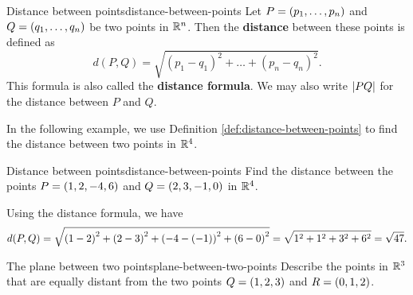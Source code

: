 \begin{definition}{Distance between points}{distance-between-points}
  Let $P=\left(p_{1},\ldots,p_{n}\right)$ and $Q=\left(q_{1},\ldots,q_{n}\right)$ be
  two points in $\mathbb{R}^{n}$. Then the \textbf{distance}
  between these points is defined as
  \begin{equation*}
    d(P, Q) = \sqrt{(p_1-q_1)^2 + \ldots + (p_n-q_n)^2}.
  \end{equation*}
  This formula is also called the \textbf{distance
    formula}. We may also write $\left|PQ\right|$
  for the distance between $P$ and $Q$.
\end{definition}

In the following example, we use Definition
\ref{def:distance-between-points} to find the distance between two
points in $\mathbb{R}^4$.

\begin{example}{Distance between points}{distance-between-points}
  Find the distance between the points $P=\left(1,2,-4,6\right)$ and
  $Q=\left(2,3,-1,0\right)$ in $\mathbb{R}^{4}$.
\end{example}

\begin{solution}
  Using the distance formula, we have
  \begin{equation*}
    d(P,Q)= \sqrt{ \left(1-2\right) ^{2}+\left(2-3\right)
      ^{2}+\left(-4-\left(-1\right) \right) ^{2}+\left(6-0\right)^{2}} =
    \sqrt{1^2+1^2+3^2+6^2} = \sqrt{47}.
  \end{equation*}
\end{solution}

\begin{example}{The plane between two points}{plane-between-two-points}
  Describe the points in $\mathbb{R}^3$ that are equally distant from the two
  points $Q=\left(1,2,3\right) $ and $R=\left(0,1,2\right)$.
\end{example}

